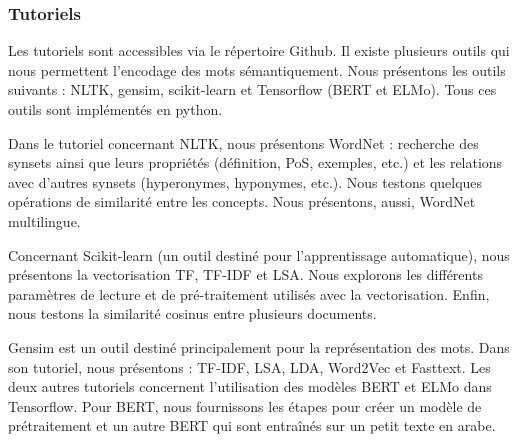 \documentclass{KodeBook}
\begin{document}
\subsubsection*{Tutoriels}

Les tutoriels sont accessibles via le répertoire Github.
Il existe plusieurs outils qui nous permettent l'encodage des mots sémantiquement. 
Nous présentons les outils suivants : NLTK, gensim, scikit-learn et Tensorflow (BERT et ELMo).
Tous ces outils sont implémentés en python.

Dans le tutoriel concernant NLTK, nous présentons WordNet : recherche des synsets ainsi que leurs propriétés (définition, PoS, exemples, etc.) et les relations avec d'autres synsets (hyperonymes, hyponymes, etc.).
Nous testons quelques opérations de similarité entre les concepts.
Nous présentons, aussi, WordNet multilingue.

Concernant Scikit-learn (un outil destiné pour l'apprentissage automatique), nous présentons la vectorisation TF, TF-IDF et LSA.
Nous explorons les différents paramètres de lecture et de pré-traitement utilisés avec la vectorisation.
Enfin, nous testons la similarité cosinus entre plusieurs documents.

Gensim est un outil destiné principalement pour la représentation des mots.
Dans son tutoriel, nous présentons : TF-IDF, LSA, LDA, Word2Vec et Fasttext.
Les deux autres tutoriels concernent l'utilisation des modèles BERT et ELMo dans Tensorflow.
Pour BERT, nous fournissons les étapes pour créer un modèle de prétraitement et un autre BERT qui sont entraînés sur un petit texte en arabe.


%
%
\end{document}
